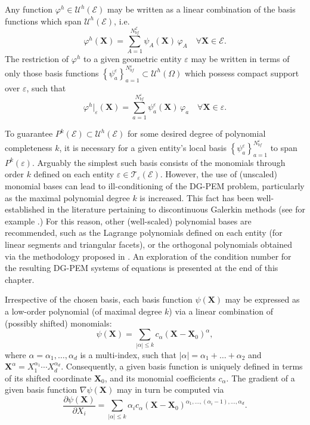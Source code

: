 		Any function $\varphi^h \in \mathcal{U}^h (\mathcal{E})$ may be written as a linear combination of the basis functions which span $\mathcal{U}^h (\mathcal{E})$, i.e.
		\begin{equation}
			\varphi^h (\mathbf{X}) = \sum_{A=1}^{N^{\mathcal{E}}_{bf}} \psi_A (\mathbf{X}) \, \varphi_A \quad \forall \mathbf{X} \in \mathcal{E}.
		\end{equation}
		The restriction of $\varphi^h$ to a given geometric entity $\varepsilon$ may be written in terms of only those basis functions $\left\{ \psi^\varepsilon_{a} \right\}_{a=1}^{N^\varepsilon_{bf}} \subset \mathcal{U}^h (\Omega)$ which possess compact support over $\varepsilon$, such that
		\begin{equation}
			\varphi^h|_\varepsilon (\mathbf{X}) = \sum_{a=1}^{N^\varepsilon_{bf}} \psi^\varepsilon_{a} (\mathbf{X}) \, \varphi_{a} \quad \forall \mathbf{X} \in \varepsilon.
		\end{equation}
		
		To guarantee $P^k (\mathcal{E}) \subset \mathcal{U}^h (\mathcal{E})$ for some desired degree of polynomial completeness $k$, it is necessary for a given entity's local basis $\left\{ \psi^\varepsilon_{a} \right\}_{a=1}^{N^\varepsilon_{bf}}$ to span $P^k (\varepsilon)$. Arguably the simplest such basis consists of the monomials through order $k$ defined on each entity $\varepsilon \in \mathcal{T}_\varepsilon (\mathcal{E})$. However, the use of (unscaled) monomial bases can lead to ill-conditioning of the DG-PEM problem, particularly as the maximal polynomial degree $k$ is increased. This fact has been well-established in the literature pertaining to discontinuous Galerkin methods (see for example \cite{Hesthaven:10}.) For this reason, other (well-scaled) polynomial bases are recommended, such as the Lagrange polynomials defined on each entity (for linear segments and triangular facets), or the orthogonal polynomials obtained via the methodology proposed in \cite{Bassi:12}. An exploration of the condition number for the resulting DG-PEM systems of equations is presented at the end of this chapter.
		
		Irrespective of the chosen basis, each basis function $\psi (\mathbf{X})$ may be expressed as a low-order polynomial (of maximal degree $k$) via a linear combination of (possibly shifted) monomials:
		\begin{equation}
			\psi (\mathbf{X}) = \sum_{|\alpha| \leq k} c_\alpha (\mathbf{X}-\mathbf{X}_0)^{\alpha},
		\end{equation}
		where $\alpha = \alpha_1, \ldots, \alpha_d$ is a multi-index, such that $|\alpha| = \alpha_1 + \ldots + \alpha_2$ and $\mathbf{X}^\alpha = X_1^{\alpha_1} \cdots X_d^{\alpha_d}$. Consequently, a given basis function is uniquely defined in terms of its shifted coordinate $\mathbf{X}_0$, and its monomial coefficients $c_\alpha$. The gradient of a given basis function $\nabla \psi (\mathbf{X})$ may in turn be computed via
		\begin{equation}
			\frac{\partial \psi (\mathbf{X})}{\partial X_i} = \sum_{|\alpha| \leq k} \alpha_i c_\alpha (\mathbf{X}-\mathbf{X}_0)^{\alpha_1, \ldots, (\alpha_i - 1), \ldots, \alpha_d}.
		\end{equation}
		
